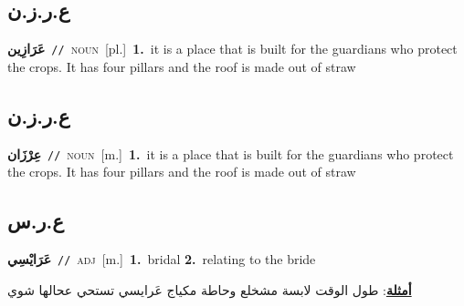 \documentclass[10pt,a4paper,twoside]{article} %
\begin{document}
\begin{multicols}{2}
\vspace{-3mm}
\subsection*{\color{blue}\foreignlanguage{arabic}{ع.ر.ز.ن}\color{blue}{}} 

{\setlength\topsep{0pt}\textbf{\foreignlanguage{arabic}{عَرَازِين}}\ {\color{gray}\texttt{//}\color{black}}\ \textsc{noun}\ [pl.]\ \textbf{1.}~it is a place that is built for the guardians who protect the crops. It has four pillars and the roof is made out of straw\ } \vspace{2mm}

\vspace{-3mm}
\subsection*{\color{blue}\foreignlanguage{arabic}{ع.ر.ز.ن}\color{blue}{ (ntws)}} 

{\setlength\topsep{0pt}\textbf{\foreignlanguage{arabic}{عِرْزَان}}\ {\color{gray}\texttt{//}\color{black}}\ \textsc{noun}\ [m.]\ \textbf{1.}~it is a place that is built for the guardians who protect the crops. It has four pillars and the roof is made out of straw\ } \vspace{2mm}

\vspace{-3mm}
\subsection*{\color{blue}\foreignlanguage{arabic}{ع.ر.س}\color{blue}{}} 

{\setlength\topsep{0pt}\textbf{\foreignlanguage{arabic}{عَرَايْسِي}}\ {\color{gray}\texttt{//}\color{black}}\ \textsc{adj}\ [m.]\ \textbf{1.}~bridal  \textbf{2.}~relating to the bride\  \begin{flushright}\color{gray}\foreignlanguage{arabic}{\textbf{\underline{\foreignlanguage{arabic}{أمثلة}}}: طول الوقت لابسة مشخلع وحاطة مكياج عَرايسي تستحي عحالها شوي}\end{flushright}\color{black}} \vspace{2mm}


\end{multicols}
\end{document}
